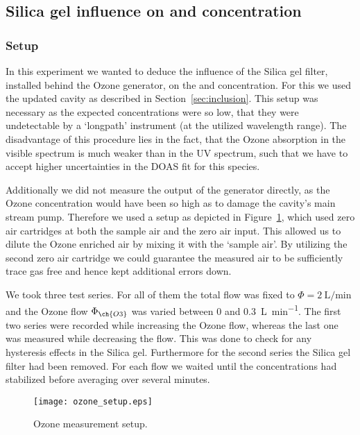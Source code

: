 \subsection{Silica gel influence on  and  concentration}
\label{sec:silica}

\subsubsection{Setup}
\label{sec:silica-setup}

In this experiment we wanted to deduce the influence of the Silica gel
filter, installed behind the Ozone generator, on the  and
 concentration. For this we used the updated cavity as
described in Section~\ref{sec:inclusion}. This setup was necessary as
the expected  concentrations were so low, that they were
undetectable by a `longpath' instrument (at the utilized wavelength
range). The disadvantage of this procedure lies in the fact, that the
Ozone absorption in the visible spectrum is much weaker than in the UV
spectrum, such that we have to accept higher uncertainties in the DOAS
fit for this species.

Additionally we did not measure the output of the generator directly,
as the Ozone concentration would have been so high as to damage the cavity's
main stream pump. Therefore we used a setup as depicted
in Figure~\ref{fig:ozone-flow-setup}, which used zero air cartridges at
both the sample air and the zero air input. This allowed us to dilute
the Ozone enriched air by mixing it with the `sample air'. By
utilizing the second zero air cartridge we could guarantee the
measured air to be sufficiently trace gas free and hence kept
additional errors down. 

We took three test series. For all of them the total flow was fixed to
$\Phi = \SI{2}{\liter\per\minute}$ and the Ozone flow $\Phi_{\ch{O3}}$
was varied between \num{0} and \SI{0.3}{\liter\per\minute}. The first
two series were recorded while increasing the Ozone flow, whereas the
last one was measured while decreasing the flow. This was done to
check for any hysteresis effects in the Silica gel. Furthermore for
the second series the Silica gel filter had been removed. For each
flow we waited until the concentrations had stabilized before
averaging over several minutes.

\begin{figure}[htbp]
  \centering
  \texttt{[image: ozone\_setup.eps]}
  \caption{Ozone measurement setup.}
  \label{fig:ozone-flow-setup}
\end{figure}

